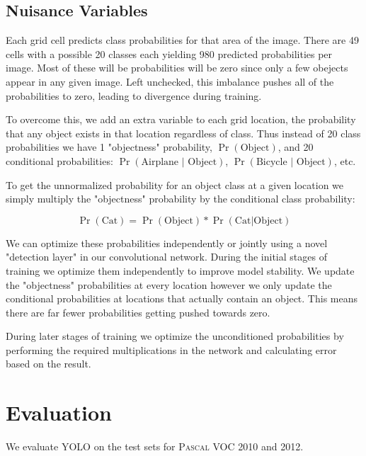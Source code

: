 \documentclass{article} %
\begin{document}
\subsection{Nuisance Variables}

Each grid cell predicts class probabilities for that area of the image. There are 49 cells with a possible 20 classes each yielding 980 predicted probabilities per image. Most of these will be probabilities will be zero since only a few obejects appear in any given image. Left unchecked, this imbalance pushes all of the probabilities to zero, leading to divergence during training.

To overcome this, we add an extra variable to each grid location, the probability that any object exists in that location regardless of class. Thus instead of 20 class probabilities we have 1 "objectness" probability, $\Pr(\textrm{Object})$, and 20 conditional probabilities: $\Pr(\textrm{Airplane | Object})$, $\Pr(\textrm{Bicycle | Object})$, etc.

To get the unnormalized probability for an object class at a given location we simply multiply the "objectness" probability by the conditional class probability:

\begin{equation}
\Pr(\textrm{Cat}) = \Pr(\textrm{Object}) * \Pr(\textrm{Cat} | \textrm{Object})
\end{equation}

We can optimize these probabilities independently or jointly using a novel "detection layer" in our convolutional network. During the initial stages of training we optimize them independently to improve model stability. We update the "objectness" probabilities at every location however we only update the conditional probabilities at locations that actually contain an object. This means there are far fewer probabilities getting pushed towards zero. 

During later stages of training we optimize the unconditioned probabilities by performing the required multiplications in the network and calculating error based on the result.

\section{Evaluation}

We evaluate YOLO on the test sets for \textsc{Pascal} VOC 2010 and 2012. 
\end{document}
